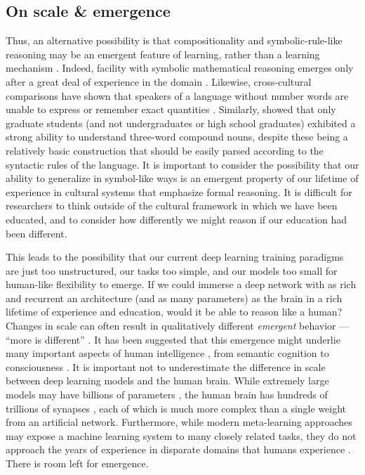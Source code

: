 \subsection{On scale \& emergence}

Thus, an alternative possibility is that compositionality and symbolic-rule-like reasoning may be an emergent feature of learning, rather than a learning mechanism \citep{McClelland1999, McClelland2002, McClelland2010, McClelland2010a}. Indeed, facility with symbolic mathematical reasoning emerges only after a great deal of experience in the domain \citep{Burger1986, McClelland2016}. Likewise, cross-cultural comparisons have shown that speakers of a language without number words are unable to express or remember exact quantities \citep{Frank2008}. Similarly, \citet{Gleitman1970} showed that only graduate students (and not undergraduates or high school graduates) exhibited a strong ability to understand three-word compound nouns, despite these being a relatively basic construction that should be easily parsed according to the syntactic rules of the language. It is important to consider the possibility that our ability to generalize in symbol-like ways is an emergent property of our lifetime of experience in cultural systems that emphasize formal reasoning. It is difficult for researchers to think outside of the cultural framework in which we have been educated, and to consider how differently we might reason if our education had been different. \par 
This leads to the possibility that our current deep learning training paradigms are just too unstructured, our tasks too simple, and our models too small for human-like flexibility to emerge. If we could immerse a deep network with as rich and recurrent an architecture (and as many parameters) as the brain in a rich lifetime of experience and education, would it be able to reason like a human? Changes in scale can often result in qualitatively different \emph{emergent} behavior --- ``more is different'' \citep{Anderson1972}. It has been suggested that this emergence might underlie many important aspects of human intelligence \citep{McClelland2010a}, from semantic cognition \citep{Rogers2008, Saxe2019} to consciousness \citep{Chalmers2006}. It is important not to underestimate the difference in scale between deep learning models and the human brain. While extremely large models may have billions of parameters \citep[e.g.][]{Radford2019}, the human brain has hundreds of trillions of synapses \citep{Drachman2005}, each of which is much more complex than a single weight from an artificial network. Furthermore, while modern meta-learning approaches may expose a machine learning system to many closely related tasks, they do not approach the years of experience in disparate domains that humans experience \citep[c.f.][]{Mitchell2018}. There is room left for emergence.\par 
